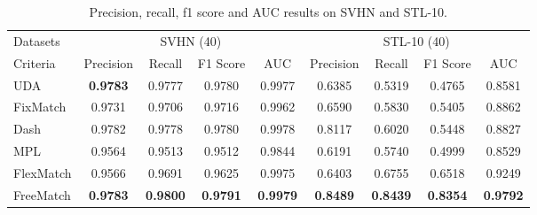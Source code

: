 \documentclass{article} \usepackage{iclr2023_conference,times}
\theoremstyle{plain}
\theoremstyle{definition}
\theoremstyle{remark}
\begin{document}
\begin{table}[h]
\centering
\caption{Precision, recall, f1 score and AUC results on SVHN and STL-10. }
\begin{adjustbox}{width=0.7 \columnwidth,center}
\label{tb-prf1_2}
\begin{tabular}{l|cccc|cccc}
\toprule
Datasets & \multicolumn{4}{c|}{SVHN (40)} & \multicolumn{4}{c}{STL-10 (40)} \\ 
\cmidrule(r){1-1} \cmidrule(lr){2-5} \cmidrule(lr){6-9} 
Criteria & \multicolumn{1}{c}{Precision}  &  \multicolumn{1}{c}{Recall}  &	\multicolumn{1}{c}{F1 Score}  &	\multicolumn{1}{c}{AUC}  & \multicolumn{1}{c}{Precision}  &  \multicolumn{1}{c}{Recall}  &	\multicolumn{1}{c}{F1 Score}  &	\multicolumn{1}{c}{AUC} \\
\cmidrule(r){1-1} \cmidrule(lr){2-5} \cmidrule(lr){6-9}

UDA &\textbf{0.9783} &0.9777 &0.9780 &0.9977 &0.6385 &0.5319 &0.4765 &0.8581\\
FixMatch   &0.9731 &0.9706 &0.9716 &0.9962 &0.6590 &0.5830 &0.5405 &0.8862 \\
Dash  &0.9782 &0.9778 &0.9780 &0.9978 &0.8117 &0.6020 &0.5448 &0.8827 \\
MPL  &0.9564 &0.9513 &0.9512 &0.9844 &0.6191 &0.5740 &0.4999 &0.8529 \\
FlexMatch  &0.9566 &0.9691 &0.9625 &0.9975 &0.6403 &0.6755 &0.6518 &0.9249 \\
FreeMatch  &\textbf{0.9783} &\textbf{0.9800} &\textbf{0.9791} &\textbf{0.9979} &\textbf{0.8489} &\textbf{0.8439} &\textbf{0.8354} &\textbf{0.9792} \\

\bottomrule
\end{tabular}
\end{adjustbox}
\end{table}
\end{document}
